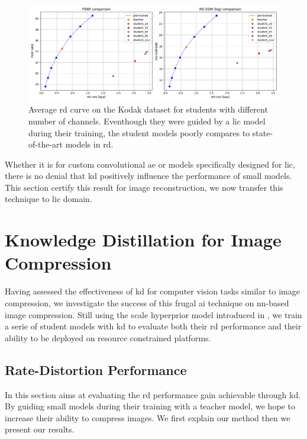 \begin{figure}
    \centering
    \includegraphics[width=15cm]{../img/kd_ae_rd.png}
    \caption[Average \acrshort{rd} curve on the Kodak dataset for students with different number of channels.]{Average \acrshort{rd} curve on the Kodak dataset for students with different number of channels. Eventhough they were guided by a \acrshort{lic} model during their training, the student models poorly compares to state-of-the-art models in \acrshort{rd}.}
    \label{kd_ae_2}
\end{figure}

Whether it is for custom convolutional \acrshort{ae} or models specifically designed for \acrshort{lic}, there is no denial that \acrshort{kd} positively influence the performance of small models. This section certify this result for image reconstruction, we now transfer this technique to \acrshort{lic} domain.

\section{Knowledge Distillation for Image Compression}
Having assessed the effectiveness of \acrshort{kd} for computer vision tasks similar to image compression, we investigate the success of this frugal \acrshort{ai} technique on \acrshort{nn}-based image compression. Still using the scale hyperprior model introduced in \cite{ballé2018variationalimagecompressionscale}, we train a serie of student models with \acrshort{kd} to evaluate both their \acrshort{rd} performance and their ability to be deployed on resource constrained platforms.

\subsection{Rate-Distortion Performance}
In this section aims at evaluating the \acrshort{rd} performance gain achievable through \acrshort{kd}. By guiding small models during their training with a teacher model, we hope to increase their ability to compress images. We first explain our method then we present our results.

